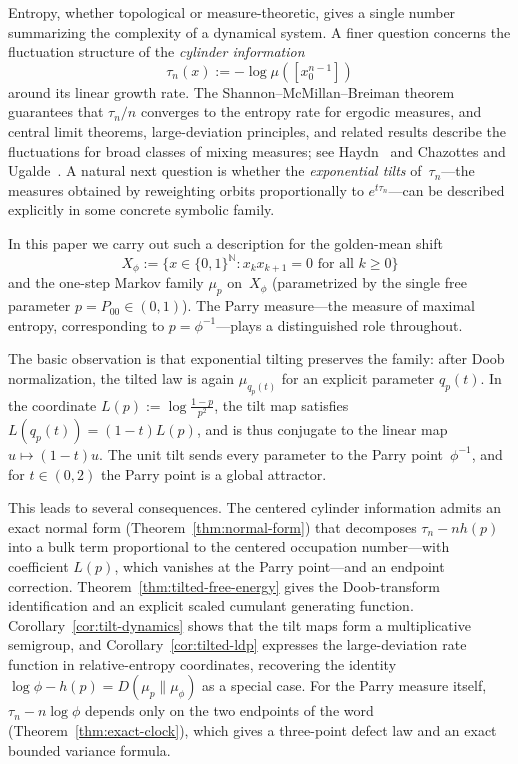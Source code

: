 \documentclass[pdflatex,sn-basic,Numbered]{sn-jnl}
\theoremstyle{thmstyleone}
\theoremstyle{thmstyletwo}
\theoremstyle{thmstylethree}
\newcommand{\NN}{\mathbb{N}}
\begin{document}
Entropy, whether topological or measure-theoretic, gives a single number summarizing the complexity of a dynamical system. A finer question concerns the fluctuation structure of the \emph{cylinder information}
\[
\tau_n(x):=-\log\mu([x_0^{n-1}])
\]
around its linear growth rate. The Shannon--McMillan--Breiman theorem guarantees that $\tau_n/n$ converges to the entropy rate for ergodic measures, and central limit theorems, large-deviation principles, and related results describe the fluctuations for broad classes of mixing measures; see Haydn~\cite{Haydn2012} and Chazottes and Ugalde~\cite{ChazottesUgalde2005}. A natural next question is whether the \emph{exponential tilts} of~$\tau_n$---the measures obtained by reweighting orbits proportionally to $e^{t\tau_n}$---can be described explicitly in some concrete symbolic family.

In this paper we carry out such a description for the golden-mean shift
\[
X_\phi:=\bigl\{x\in\{0,1\}^{\NN}: x_kx_{k+1}=0 \text{ for all } k\ge 0\bigr\}
\]
and the one-step Markov family $\mu_p$ on~$X_\phi$ (parametrized by the single free parameter $p=P_{00}\in(0,1)$). The Parry measure---the measure of maximal entropy, corresponding to $p=\phi^{-1}$---plays a distinguished role throughout.

The basic observation is that exponential tilting preserves the family: after Doob normalization, the tilted law is again $\mu_{q_p(t)}$ for an explicit parameter $q_p(t)$. In the coordinate $L(p):=\log\frac{1-p}{p^2}$, the tilt map satisfies $L(q_p(t))=(1-t)L(p)$, and is thus conjugate to the linear map $u\mapsto(1-t)u$. The unit tilt sends every parameter to the Parry point~$\phi^{-1}$, and for $t\in(0,2)$ the Parry point is a global attractor.

This leads to several consequences. The centered cylinder information admits an exact normal form (Theorem~\ref{thm:normal-form}) that decomposes $\tau_n-nh(p)$ into a bulk term proportional to the centered occupation number---with coefficient $L(p)$, which vanishes at the Parry point---and an endpoint correction. Theorem~\ref{thm:tilted-free-energy} gives the Doob-transform identification and an explicit scaled cumulant generating function. Corollary~\ref{cor:tilt-dynamics} shows that the tilt maps form a multiplicative semigroup, and Corollary~\ref{cor:tilted-ldp} expresses the large-deviation rate function in relative-entropy coordinates, recovering the identity $\log\phi-h(p)=D(\mu_p\|\mu_\phi)$ as a special case. For the Parry measure itself, $\tau_n-n\log\phi$ depends only on the two endpoints of the word (Theorem~\ref{thm:exact-clock}), which gives a three-point defect law and an exact bounded variance formula.
\end{document}
